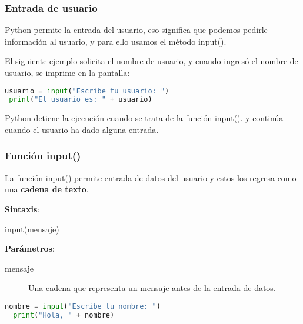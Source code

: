 \begin{frame}[fragile]
  \frametitle{Entrada de usuario}

  Python permite la entrada del usuario, eso significa que podemos pedirle
  información al usuario, y para ello usamos el método
  \textcolor{codeKeyword}{input}().

  \vspace{\baselineskip}
  El siguiente ejemplo solicita el nombre de usuario, y cuando ingresó el
  nombre de usuario, se imprime en la pantalla:

  \vspace{\baselineskip}
  \begin{lstlisting}[language=Python]
 usuario = input("Escribe tu usuario: ")
 print("El usuario es: " + usuario)
  \end{lstlisting}

  \pausa
  \begin{exampleblock}{}
    Python detiene la ejecución cuando se trata de la función
    \textcolor{codeKeyword}{input}().
    y continúa cuando el usuario ha dado alguna entrada.
  \end{exampleblock}
\end{frame}

\begin{frame}[fragile]
  \frametitle{Función input()}

  La función \textcolor{codeKeyword}{input}() permite entrada de datos del
  usuario y estos los regresa como una \textbf{cadena de texto}.

  \vspace{\baselineskip}
  \textbf{Sintaxis}:

  \vspace{\baselineskip}
  \textcolor{codeKeyword}{input}(mensaje)

  \vspace{\baselineskip}
  \textbf{Parámetros}:
  \begin{description}
    \item[mensaje] Una cadena que representa un mensaje antes de la entrada
      de datos.
  \end{description}

  \vspace{\baselineskip}
  \begin{lstlisting}[language=Python]
  nombre = input("Escribe tu nombre: ")
  print("Hola, " + nombre)
  \end{lstlisting}
\end{frame}

